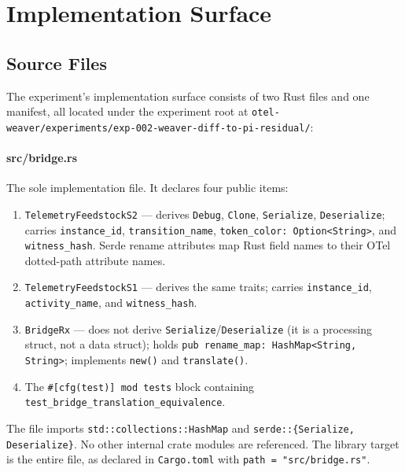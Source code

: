 
\section{Implementation Surface}
\label{sec:otel-weaver-exp-002-diff-to-residual-impl}

\subsection{Source Files}
\label{sec:otel-weaver-exp-002-diff-to-residual-impl-sources}

The experiment's implementation surface consists of two Rust files and one
manifest, all located under the experiment root at
\texttt{otel-weaver/experiments/exp-002-weaver-diff-to-pi-residual/}:

\paragraph{src/bridge.rs}
The sole implementation file. It declares four public items:
\begin{enumerate}
    \item \texttt{TelemetryFeedstockS2} --- derives \texttt{Debug}, \texttt{Clone},
          \texttt{Serialize}, \texttt{Deserialize}; carries \texttt{instance\_id},
          \texttt{transition\_name}, \texttt{token\_color: Option<String>}, and
          \texttt{witness\_hash}. Serde rename attributes map Rust field names to
          their OTel dotted-path attribute names.
    \item \texttt{TelemetryFeedstockS1} --- derives the same traits; carries
          \texttt{instance\_id}, \texttt{activity\_name}, and \texttt{witness\_hash}.
    \item \texttt{BridgeRx} --- does not derive \texttt{Serialize}/\texttt{Deserialize}
          (it is a processing struct, not a data struct); holds
          \texttt{pub rename\_map: HashMap<String, String>}; implements \texttt{new()}
          and \texttt{translate()}.
    \item The \texttt{\#[cfg(test)] mod tests} block containing
          \texttt{test\_bridge\_translation\_equivalence}.
\end{enumerate}

The file imports \texttt{std::collections::HashMap} and
\texttt{serde::\{Serialize, Deserialize\}}. No other internal crate modules are
referenced. The library target is the entire file, as declared in \texttt{Cargo.toml}
with \texttt{path = "src/bridge.rs"}.

